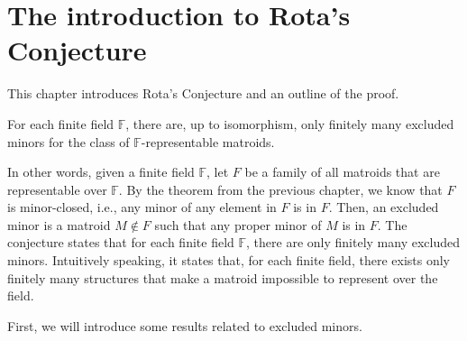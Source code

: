 \section{The introduction to Rota's Conjecture}
This chapter introduces Rota's Conjecture and an outline of the proof.

\begin{conj}
For each finite field $\mathbb{F}$, there are, up to isomorphism, only finitely many excluded minors for the class of $\mathbb{F}$-representable matroids.
\end{conj}

In other words, given a finite field $\mathbb{F}$, let $F$ be a family of all matroids that are representable over $\mathbb{F}$.
By the theorem from the previous chapter, we know that $F$ is minor-closed, i.e., any minor of any element in $F$ is in $F$.
Then, an excluded minor is a matroid $M \notin F$ such that any proper minor of $M$ is in $F$.
The conjecture states that for each finite field $\mathbb{F}$, there are only finitely many excluded minors.
Intuitively speaking, it states that, for each finite field, there exists only finitely many structures that make a matroid impossible to represent over the field.

First, we will introduce some results related to excluded minors.

